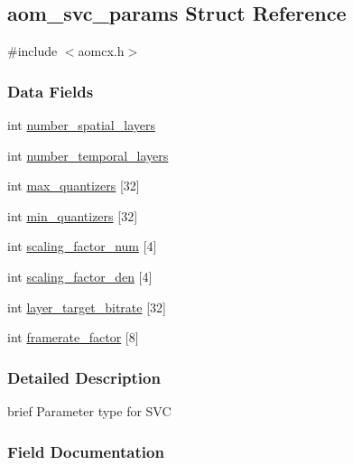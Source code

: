 \hypertarget{structaom__svc__params}{}\subsection{aom\+\_\+svc\+\_\+params Struct Reference}
\label{structaom__svc__params}


{\ttfamily \#include $<$aomcx.\+h$>$}

\subsubsection*{Data Fields}
\begin{DoxyCompactItemize}
\item 
int \hyperlink{structaom__svc__params_a3ac79ae856b34c3a8a44e1615ef452d5}{number\+\_\+spatial\+\_\+layers}
\item 
int \hyperlink{structaom__svc__params_adae9509ce69067d122d9a4bcae94b340}{number\+\_\+temporal\+\_\+layers}
\item 
int \hyperlink{structaom__svc__params_a3366999bf6b17fa3ad2b2a57092ddcee}{max\+\_\+quantizers} \mbox{[}32\mbox{]}
\item 
int \hyperlink{structaom__svc__params_a558bc3a8d00cabe8f112c8977e927d0c}{min\+\_\+quantizers} \mbox{[}32\mbox{]}
\item 
int \hyperlink{structaom__svc__params_af29066b136efb3837dfc674d2bcc60f2}{scaling\+\_\+factor\+\_\+num} \mbox{[}4\mbox{]}
\item 
int \hyperlink{structaom__svc__params_a89c964e4a3e25c4c76bb20242bee3f6b}{scaling\+\_\+factor\+\_\+den} \mbox{[}4\mbox{]}
\item 
int \hyperlink{structaom__svc__params_a524061efd3e5cb962d364d0d20fd1433}{layer\+\_\+target\+\_\+bitrate} \mbox{[}32\mbox{]}
\item 
int \hyperlink{structaom__svc__params_a52a517b31b478cbd4b60d690979cc314}{framerate\+\_\+factor} \mbox{[}8\mbox{]}
\end{DoxyCompactItemize}


\subsubsection{Detailed Description}
brief Parameter type for S\+VC 

\subsubsection{Field Documentation}
\mbox{\label{structaom__svc__params_a3ac79ae856b34c3a8a44e1615ef452d5}} 
